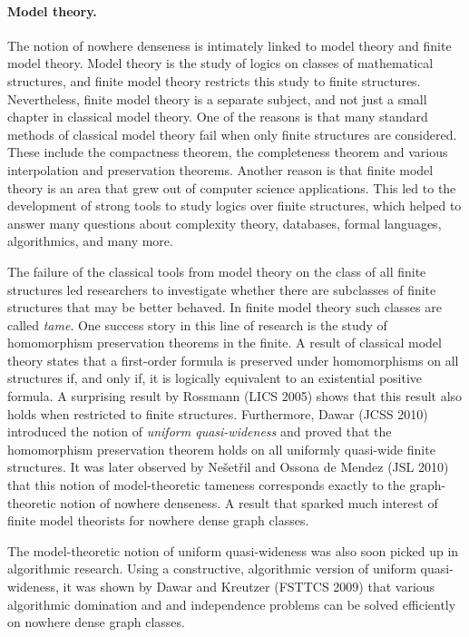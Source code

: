 \paragraph*{Model theory.}

The notion of nowhere denseness is intimately linked to 
model theory and finite model theory. 
Model theory is the study of logics on classes of 
mathematical structures, and finite model theory restricts this
study to finite structures. Nevertheless, finite model theory is
a separate subject, and not just a small chapter in classical
model theory. One of the reasons is that many standard 
methods of classical model theory fail when only finite structures 
are considered. These include the compactness theorem, the 
completeness theorem and various interpolation and preservation
theorems. Another reason is that finite model theory is an area 
that grew out of computer science applications. This led to
the development of strong tools to study logics over finite 
structures, which helped to answer many questions about 
complexity theory, databases, formal languages, algorithmics,
and many more. 

The failure of the classical tools from model theory on the class 
of all finite structures led researchers to investigate whether
there are subclasses of finite structures that may be 
better behaved. In finite model 
theory such classes are called \emph{tame}. One success story 
in this line of research is the study of homomorphism
preservation theorems in the finite. A result of classical model 
theory states that a first-order formula is preserved under
homomorphisms on all structures if, and only if, it is logically 
equivalent to an existential positive formula. A surprising 
result by Rossmann (LICS 2005) shows that this result also holds when 
restricted to finite structures. Furthermore, Dawar (JCSS 2010) introduced
the notion of \emph{uniform quasi-wideness} and proved 
that the homomorphism preservation theorem holds on all
uniformly quasi-wide finite structures. It was later observed 
by Ne\v{s}et\v{r}il and Ossona de Mendez (JSL 2010) that this notion 
of model-theoretic tameness corresponds exactly to the 
graph-theoretic notion of nowhere denseness. A result that
sparked much interest of finite model theorists for nowhere
dense graph classes.

The model-theoretic notion of uniform quasi-wideness was 
also soon picked up in algorithmic research. Using a constructive, 
algorithmic version of uniform quasi-wideness, it was shown
by Dawar and Kreutzer (FSTTCS 2009) that various algorithmic domination and 
and independence problems can be solved efficiently on 
nowhere dense graph classes. 

